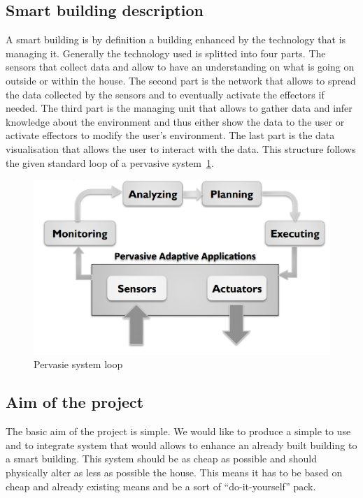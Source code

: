 \documentclass{acm_proc_article-sp}
\begin{document}
\subsection{Smart building description}
A smart building is by definition a building enhanced by the technology that is managing it. 
Generally the technology used is splitted into four parts. 
The sensors that collect data and allow to have an understanding on what is going on outside or within the house. 
The second part is the network that allows to spread the data collected by the sensors and to eventually activate the effectors if needed. 
The third part is the managing unit that allows to gather data and infer knowledge about the environment and thus either show the data to the user or activate effectors to modify the user’s environment. 
The last part is the data visualisation that allows the user to interact with the data.
This structure follows the given standard loop of a pervasive system~\ref{loop}.
				\begin{figure}[htb]
				\begin{center}
				\includegraphics[width=\linewidth]{loop}
				\caption{Pervasie system loop \label{loop}}
				\end{center}
				\end{figure}


\subsection{Aim of the project}
The basic aim of the project is simple.
We would like to produce a simple to use and to integrate system that would allows to enhance an already built building to a smart building. 
This system should be as cheap as possible and should physically alter as less as possible the house. 
This means it has to be based on cheap and already existing means and be a sort of “do-it-yourself” pack.
\end{document}
